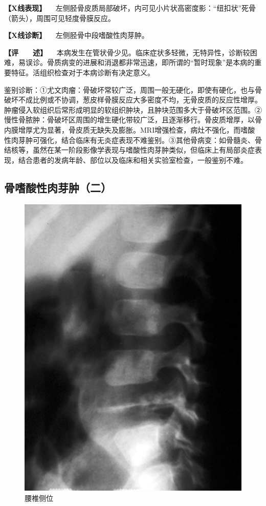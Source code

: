 \textbf{【X线表现】}
　左侧胫骨皮质局部破坏，内可见小片状高密度影：“纽扣状”死骨（箭头），周围可见轻度骨膜反应。

\textbf{【X线诊断】} 　左侧胫骨中段嗜酸性肉芽肿。

\textbf{【评　　述】}
　本病发生在管状骨少见。临床症状多轻微，无特异性，诊断较困难，易误诊。骨质病变的进展和消退都非常迅速，即所谓的“暂时现象”是本病的重要特征。活组织检查对于本病诊断有决定意义。

鉴别诊断：①尤文肉瘤：骨破坏常较广泛，周围一般无硬化，即使有硬化，也与骨破坏不成比例或不协调，葱皮样骨膜反应大多密度不均，无骨皮质的反应性增厚。肿瘤侵入软组织后常形成明显的软组织肿块，且肿块范围多大于骨破坏区范围。②慢性骨脓肿：骨破坏区周围的增生硬化带较广泛，且逐渐移行。骨皮质增厚，以骨内膜增厚尤为显著，骨皮质无缺失及膨胀。MRI增强检查，病灶不强化，而嗜酸性肉芽肿可强化，结合临床有无炎症表现不难鉴别。③其他骨病变：如骨髓炎、骨结核等，虽然在某一阶段影像学表现与嗜酸性肉芽肿类似，但临床上有局部炎症表现，结合患者的发病年龄、部位以及临床和相关实验室检查，一般鉴别不难。

\subsection{骨嗜酸性肉芽肿（二）}

\begin{figure}[!htbp]
 \centering
 \includegraphics{./images/Image00112.jpg}
 \captionsetup{justification=centering}
 \caption{腰椎侧位}
 \label{fig2-7-27}
  \end{figure} 

